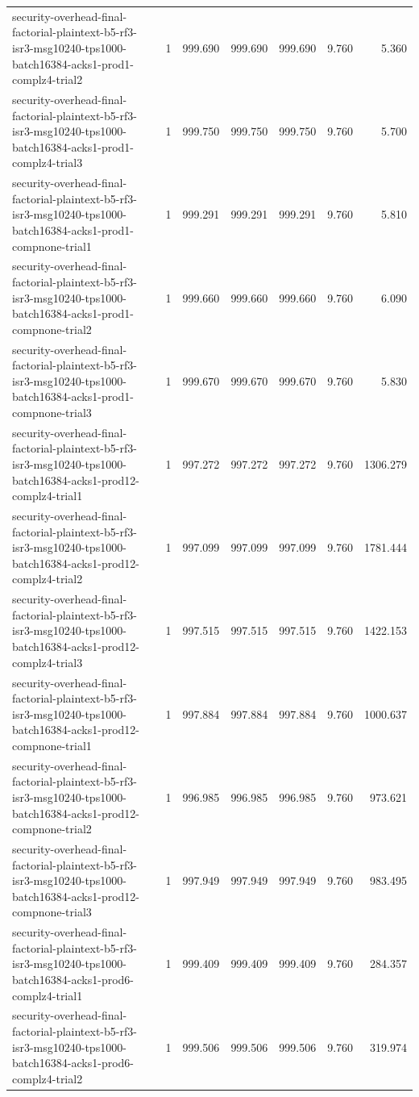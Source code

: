 \begin{tabular}{lrrrrrr}
security-overhead-final-factorial-plaintext-b5-rf3-isr3-msg10240-tps1000-batch16384-acks1-prod1-complz4-trial2 & 1 & 999.690 & 999.690 & 999.690 & 9.760 & 5.360 \\
security-overhead-final-factorial-plaintext-b5-rf3-isr3-msg10240-tps1000-batch16384-acks1-prod1-complz4-trial3 & 1 & 999.750 & 999.750 & 999.750 & 9.760 & 5.700 \\
security-overhead-final-factorial-plaintext-b5-rf3-isr3-msg10240-tps1000-batch16384-acks1-prod1-compnone-trial1 & 1 & 999.291 & 999.291 & 999.291 & 9.760 & 5.810 \\
security-overhead-final-factorial-plaintext-b5-rf3-isr3-msg10240-tps1000-batch16384-acks1-prod1-compnone-trial2 & 1 & 999.660 & 999.660 & 999.660 & 9.760 & 6.090 \\
security-overhead-final-factorial-plaintext-b5-rf3-isr3-msg10240-tps1000-batch16384-acks1-prod1-compnone-trial3 & 1 & 999.670 & 999.670 & 999.670 & 9.760 & 5.830 \\
security-overhead-final-factorial-plaintext-b5-rf3-isr3-msg10240-tps1000-batch16384-acks1-prod12-complz4-trial1 & 1 & 997.272 & 997.272 & 997.272 & 9.760 & 1306.279 \\
security-overhead-final-factorial-plaintext-b5-rf3-isr3-msg10240-tps1000-batch16384-acks1-prod12-complz4-trial2 & 1 & 997.099 & 997.099 & 997.099 & 9.760 & 1781.444 \\
security-overhead-final-factorial-plaintext-b5-rf3-isr3-msg10240-tps1000-batch16384-acks1-prod12-complz4-trial3 & 1 & 997.515 & 997.515 & 997.515 & 9.760 & 1422.153 \\
security-overhead-final-factorial-plaintext-b5-rf3-isr3-msg10240-tps1000-batch16384-acks1-prod12-compnone-trial1 & 1 & 997.884 & 997.884 & 997.884 & 9.760 & 1000.637 \\
security-overhead-final-factorial-plaintext-b5-rf3-isr3-msg10240-tps1000-batch16384-acks1-prod12-compnone-trial2 & 1 & 996.985 & 996.985 & 996.985 & 9.760 & 973.621 \\
security-overhead-final-factorial-plaintext-b5-rf3-isr3-msg10240-tps1000-batch16384-acks1-prod12-compnone-trial3 & 1 & 997.949 & 997.949 & 997.949 & 9.760 & 983.495 \\
security-overhead-final-factorial-plaintext-b5-rf3-isr3-msg10240-tps1000-batch16384-acks1-prod6-complz4-trial1 & 1 & 999.409 & 999.409 & 999.409 & 9.760 & 284.357 \\
security-overhead-final-factorial-plaintext-b5-rf3-isr3-msg10240-tps1000-batch16384-acks1-prod6-complz4-trial2 & 1 & 999.506 & 999.506 & 999.506 & 9.760 & 319.974 \\

\end{tabular}
